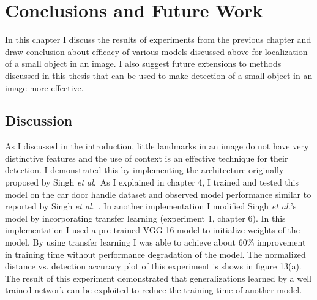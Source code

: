\documentclass [11pt,letterpaper ,twoside ,openany ]{report}
\begin{document}
    \chapter{Conclusions and Future Work}
    \doublespacing

    In this chapter I discuss the results of experiments from the previous chapter and draw conclusion about efficacy of various models discussed above for localization of a small object in an image. I also suggest future extensions to methods discussed in this thesis that can be used to make detection of a small object in an image more effective.

    \section{Discussion}

    As I discussed in the introduction, little landmarks in an image do not have very distinctive features and the use of context is an effective technique for their detection. I demonstrated this by implementing the architecture originally proposed by Singh \textit{et al}.\ As I explained in chapter 4, I trained and tested this model on the car door handle dataset and observed model performance similar to reported by Singh \textit{et al}.\ \cite{Singh_2016_CVPR}. In another implementation I modified Singh \textit{et al.}'s model \cite{Singh_2016_CVPR} by incorporating transfer learning (experiment 1, chapter 6). In this implementation I used a pre-trained VGG-16 model \cite{simonyan2014very} to initialize weights of the model. By using transfer learning I was able to achieve about 60\% improvement in training time without performance degradation of the model. The normalized distance vs. detection accuracy plot of this experiment is shows in figure 13(a). The result of this experiment demonstrated that generalizations learned by a well trained network can be exploited to reduce the training time of another model.
\end{document}
